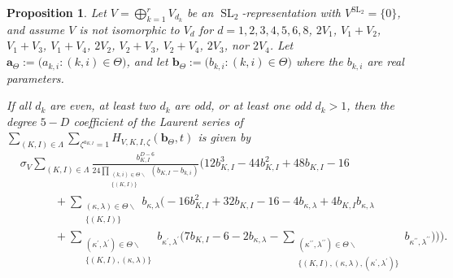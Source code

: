\documentclass{amsart}
\newtheorem{proposition}[theorem]{Proposition}
\theoremstyle{definition}
\theoremstyle{remark}
\newcommand{\SL}{\operatorname{SL}}
\newcommand{\bs}{\boldsymbol}
\begin{document}
\begin{proposition}
\label{prop:Gamma2First}
Let $V = \bigoplus_{k=1}^r V_{d_k}$ be an $\SL_2$-representation with $V^{\SL_2} = \{0\}$,
and assume $V$ is not isomorphic to $V_d$ for $d=1,2,3,4,5,6,8$, $2V_1$, $V_1+V_2$, $V_1+V_3$, $V_1+V_4$,
$2V_2$, $V_2+V_3$, $V_2+V_4$, $2V_3$, nor $2V_4$. Let $\bs{a}_\Theta := \big(a_{k,i} : (k,i)\in\Theta\big)$, and let
$\bs{b}_\Theta := \big(b_{k,i} : (k,i)\in\Theta\big)$ where the $b_{k,i}$ are
real parameters.

If all $d_k$ are even, at least two $d_k$ are odd, or at least one odd $d_k > 1$, then the degree $5-D$ coefficient
of the Laurent series of $\sum_{(K,I)\in\Lambda} \sum_{\zeta^{a_{K,I}} = 1} H_{V,K,I,\zeta}(\bs{b}_\Theta,t)$ is given by
\begin{align}
    \label{eq:Gamma2FirstCase1}
    &\sigma_V\sum\limits_{(K,I)\in\Lambda}
        \frac{b_{K,I}^{D-6}}
        {24 \prod\limits_{\substack{(k,i)\in\Theta\smallsetminus \\ \{ (K,I)\} }} (b_{K,I} - b_{k,i})}
        \bigg(  12b_{K,I}^3 - 44b_{K,I}^2 + 48b_{K,I} - 16
                \\ \nonumber &\quad\quad\quad +
                \sum\limits_{\substack{(\kappa,\lambda)\in\Theta\smallsetminus \\ \{ (K,I)\} }} b_{\kappa,\lambda} \Big(
                    - 16b_{K,I}^2 + 32 b_{K,I} - 16
                        - 4 b_{\kappa,\lambda} + 4 b_{K,I} b_{\kappa,\lambda}
                \\ \nonumber &\quad\quad\quad
                    + \sum\limits_{\substack{(\kappa^\prime,\lambda^\prime)\in\Theta\smallsetminus
                            \\ \{(K,I),(\kappa,\lambda)\}}} b_{\kappa^\prime,\lambda^\prime} \Big(
                        7 b_{K,I}
                        - 6
                        - 2 b_{\kappa,\lambda}
                        -  \sum\limits_{\substack{(\kappa^{\prime\prime},\lambda^{\prime\prime})\in\Theta\smallsetminus
                            \\ \{(K,I),(\kappa,\lambda),(\kappa^{\prime},\lambda^{\prime})\}}}
                            b_{\kappa^{\prime\prime},\lambda^{\prime\prime}}
        \Big) \Big)\bigg).
\end{align}


\end{proposition}
\end{document}
